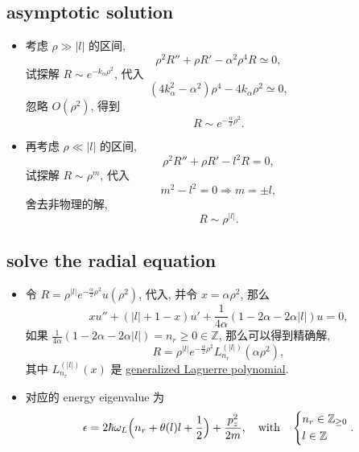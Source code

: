 \subsection{asymptotic solution}
\begin{itemize}
	\item 考虑 $\rho \gg |l|$ 的区间,
	\begin{equation}
		\rho^2 R'' + \rho R' - \alpha^2 \rho^4 R \simeq 0,
	\end{equation}
	试探解 $R \sim e^{- k_\alpha \rho^2}$, 代入
	\begin{equation}
		(4 k_\alpha^2 - \alpha^2) \rho^4 - 4 k_\alpha \rho^2 \simeq 0,
	\end{equation}
	忽略 $O(\rho^2)$, 得到
	\begin{equation}
		R \sim e^{- \frac{\alpha}{2} \rho^2}.
	\end{equation}
	
	\item 再考虑 $\rho \ll |l|$ 的区间,
	\begin{equation}
		\rho^2 R'' + \rho R' - l^2 R = 0,
	\end{equation}
	试探解 $R \sim \rho^m$, 代入
	\begin{equation}
		m^2 - l^2 = 0 \Longrightarrow m = \pm l,
	\end{equation}
	舍去非物理的解,
	\begin{equation}
		R \sim \rho^{|l|}.
	\end{equation}
\end{itemize}

\subsection{solve the radial equation}
\begin{itemize}
	\item 令 $R = \rho^{|l|} e^{- \frac{\alpha}{2} \rho^2} u(\rho^2)$, 代入, 并令 $x = \alpha \rho^2$, 那么
	\begin{equation}
		x u'' + (|l| + 1 - x) u' + \frac{1}{4 \alpha} (1 - 2 \alpha - 2 \alpha |l|) u = 0,
	\end{equation}
	如果 $\frac{1}{4 \alpha} (1 - 2 \alpha - 2 \alpha |l|) = n_r \geq 0 \in \mathbb{Z}$, 那么可以得到精确解,
	\begin{equation}
		R = \rho^{|l|} e^{- \frac{\alpha}{2} \rho^2} L_{n_r}^{(|l|)}(\alpha \rho^2),
	\end{equation}
	其中 $L_{n_r}^{(|l|)}(x)$ 是 \href{https://en.wikipedia.org/wiki/Laguerre_polynomials#Generalized_Laguerre_polynomials}{generalized Laguerre polynomial}.
	
	\item 对应的 energy eigenvalue 为
	\begin{equation} \label{A.1.14}
		\epsilon = 2 \hbar \omega_L \Big( n_r + \theta(l) l + \frac{1}{2} \Big) + \frac{p_z^2}{2 m}, \quad \text{with} \quad \begin{dcases}
			n_r \in \mathbb{Z}_{\geq 0} \\
			l \in \mathbb{Z}
		\end{dcases}.
	\end{equation}
\end{itemize}

